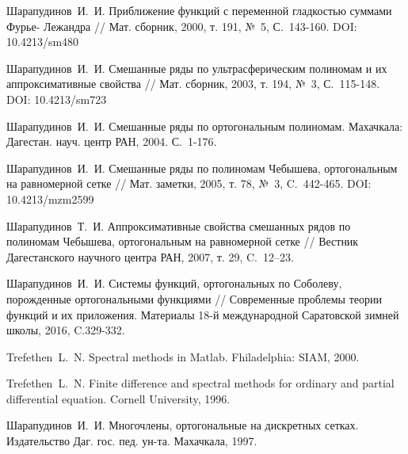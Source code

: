 \begin{thebibliography}{999}

 Шарапудинов~И.~И. Приближение функций с переменной гладкостью суммами Фурье- Лежандра // Мат. сборник, 2000, т. 191, №~5, С.~143-160. DOI: 10.4213/sm480




 Шарапудинов~И.~И. Смешанные ряды по ультрасферическим полиномам и их аппроксимативные свойства // Мат. сборник, 2003, т. 194, №~3, С.~115-148. DOI: 10.4213/sm723




 Шарапудинов~И.~И. Смешанные ряды по ортогональным полиномам. Махачкала: Дагестан. науч. центр РАН, 2004. С.~1-176.




 Шарапудинов~И.~И. Смешанные ряды по полиномам Чебышева, ортогональным на равномерной сетке // Мат. заметки, 2005, т. 78, №~3, C.~442-465. DOI: 10.4213/mzm2599




 Шарапудинов~Т.~И. Аппроксимативные свойства смешанных рядов по полиномам Чебышева, ортогональным на равномерной сетке // Вестник Дагестанского научного центра РАН, 2007, т. 29, C.~12–23.




 Шарапудинов~И.~И. Системы функций, ортогональных по Соболеву, порожденные ортогональными функциями // Современные проблемы теории функций и их приложения.  Материалы 18-й международной Саратовской зимней школы, 2016, C.329-332.




 Trefethen~L.~N. Spectral methods in Matlab. Fhiladelphia: SIAM, 2000.




 Trefethen~L.~N. Finite difference and spectral methods for ordinary and partial differential equation. Cornell University, 1996.




 Шарапудинов~И.~И. Многочлены, ортогональные на дискретных сетках. Издательство Даг. гос. пед. ун-та. Махачкала, 1997.




\end{thebibliography}

